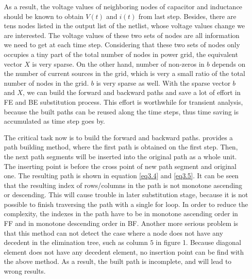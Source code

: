 As a result, the voltage values of neighboring nodes of capacitor and inductance should be 
known to obtain $V(t)$ and $i(t)$ from last step. Besides, there are tens nodes listed in the output list of the netlist, whose voltage values change we are interested. The voltage values of
these two sets of nodes are all information we need to get at each time step. Considering that these two sets of nodes only occupies a
tiny part of the total number of nodes in power grid, the equivalent
vector $X$ is very sparse. On the other hand, number of non-zeros in $b$ depends on the number of current sources in the grid, which is 
very a small ratio of the total number of nodes in the grid. $b$ is very sparse as well. With the sparse vector $b$ and $X$, we can build 
the forward and backward paths and save a lot of effort in FE and BE substitution process. This effort is worthwhile for transient 
analysis, because the built paths can be reused along the time steps, thus time saving is accumulated as time step goes by.

The critical task now is to build the forward and backward paths. \cite{Tinney} provides a path building method, where the first path is 
obtained on the first step. Then, the next path segments will be inserted into the original path as a whole unit. The inserting point is 
before the cross point of new path segment and original one. The resulting path is shown in equation \eqref{eq3.4} and \eqref{eq3.5}. It
can be seen that the resulting index of rows/columns in the path is not monotone ascending or descending. This will cause trouble in
later substitution stage, because it is not possible to finish traversing the path with a single for loop. In order to reduce the 
complexity, the indexes in the path have to be in monotone ascending order in FF and in monotone descending order in BF. Another more 
serious problem is that this method can not detect the case where a node does not have any decedent in the elimination tree, such as column $5$ in figure 1. Because diagonal element does not have any decedent element, no insertion point can be find with the above method. As a result, the built path is incomplete, and will lead to wrong results. 

